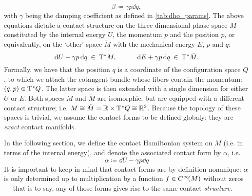 \begin{equation}
    \beta \coloneq \gamma p \dd{q},
    \label{eq:dho_work_form}
\end{equation}
with $\gamma$ being the damping coefficient as defined in \cref{tab:dho_params}. The above equations dictate a contact structure on the three-dimensional phase space $M$ constituted by the internal energy $U$, the momentum $p$ and the position $p$, or equivalently, on the `other' space $\tilde{M}$ with the mechanical energy $E$, $p$ and $q$:
$$ \dd{U} - \gamma p \dd{q} \: \in \: \mathrm{T}^*M, \qquad \quad \dd{E} + \gamma p \dd{q} \: \in \: \mathrm{T}^*\tilde{M}. $$
Formally, we have that the position $q$ is a coordinate of the configuration space $Q$, to which we attach the cotangent bundle whose fibers contain the momentum: $ (q, p) \in \mathrm{T}^*Q$. The latter space is then extended with a single dimension for either $U$ or $E$. Both spaces $M$ and $\tilde{M}$ are isomorphic, but are equipped with a different contact structure; i.e. $M \cong \tilde{M} = \mathbb{R} \times \mathrm{T}^*Q \cong \mathbb{R}^3$. Because the topology of these spaces is trivial, we assume the contact forms to be defined globaly: they are \emph{exact} contact manifolds.

In the following section, we define the contact Hamiltonian system on $M$ (i.e. in terms of the internal energy), and denote the associated contact form by $\alpha$, i.e.
\begin{equation}
    \alpha \coloneq \dd{U} - \gamma p \dd{q}
    \label{eq:dho_contact_form_thermo}
\end{equation}
It is important to keep in mind that contact forms are by definition nonunique: $\alpha$ is only determined up to multiplication by a function $f \in C^\infty\!\qty(M)$ without zeros --- that is to say, any of those forms gives rise to the same contact \emph{structure}.

